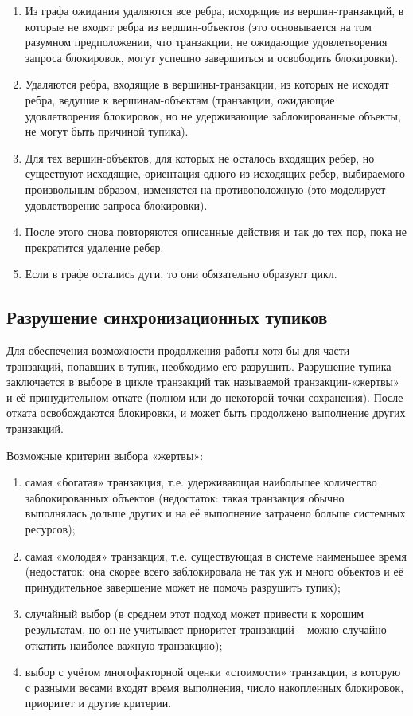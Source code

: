 \documentclass[a4paper,12pt]{article}
\begin{document}
\begin{enumerate}
    \item Из графа ожидания удаляются все ребра, исходящие из вершин-транзакций, в которые не входят ребра из вершин-объектов (это основывается на том разумном предположении, что транзакции, не ожидающие удовлетворения запроса блокировок, могут успешно завершиться и освободить блокировки).
    \item Удаляются ребра, входящие в вершины-транзакции, из которых не исходят ребра, ведущие к вершинам-объектам (транзакции, ожидающие удовлетворения блокировок, но не удерживающие заблокированные объекты, не могут быть причиной тупика).
    \item Для тех вершин-объектов, для которых не осталось входящих ребер, но существуют исходящие, ориентация одного из исходящих ребер, выбираемого произвольным образом, изменяется на противоположную (это моделирует удовлетворение запроса блокировки).
    \item После этого снова повторяются описанные действия и так до тех пор, пока не прекратится удаление ребер.
    \item Если в графе остались дуги, то они обязательно образуют цикл.
\end{enumerate}

\subsection{Разрушение синхронизационных тупиков}

Для обеспечения возможности продолжения работы хотя бы для части транзакций, попавших в тупик, необходимо его разрушить. Разрушение тупика заключается в выборе в цикле транзакций так называемой транзакции-«жертвы» и её принудительном откате (полном или до некоторой точки сохранения). После отката освобождаются блокировки, и может быть продолжено выполнение других транзакций.

Возможные критерии выбора «жертвы»:
\begin{enumerate}
    \item самая «богатая» транзакция, т.е. удерживающая наибольшее количество заблокированных объектов (недостаток: такая транзакция обычно выполнялась дольше других и на её выполнение затрачено больше системных ресурсов);
    \item самая «молодая» транзакция, т.е. существующая в системе наименьшее время (недостаток: она скорее всего заблокировала не так уж и много объектов и её принудительное завершение может не помочь разрушить тупик);
    \item случайный выбор (в среднем этот подход может привести к хорошим результатам, но он не учитывает приоритет транзакций – можно случайно откатить наиболее важную транзакцию);
    \item выбор с учётом многофакторной оценки «стоимости» транзакции, в которую с разными весами входят время выполнения, число накопленных блокировок, приоритет и другие критерии.
\end{enumerate}
\end{document}
